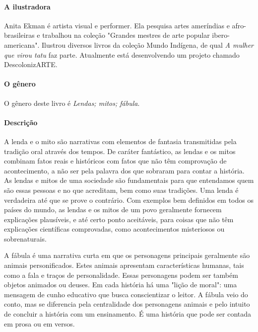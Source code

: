 \documentclass[11pt]{extarticle}
\begin{document}

\paragraph{A ilustradora} Anita Ekman é artista visual e performer. Ela pesquisa artes ameríndias e afro-brasileiras e trabalhou na coleção "Grandes mestres de arte popular ibero-americana". Ilustrou diversos livros da coleção Mundo Indígena, de qual \textit{A mulher que virou tatu} faz parte. Atualmente está desenvolvendo um projeto chamado DescolonizARTE.


\paragraph{O gênero} O gênero deste livro é \textit{Lendas; mitos; fábula}. 

\paragraph{Descrição} A lenda e o mito são narrativas com elementos de fantasia transmitidas pela tradição oral através dos tempos. De caráter fantástico, as lendas e os mitos combinam fatos reais e históricos com fatos que não têm comprovação de acontecimento, a não ser pela palavra dos que sobraram para contar a história. As lendas e mitos de uma sociedade são fundamentais para que entendamos quem são essas pessoas e no que acreditam, bem como suas tradições. Uma lenda é verdadeira até que se prove o contrário. Com exemplos bem definidos em todos os países do mundo, as lendas e os mitos de um povo geralmente fornecem explicações plausíveis, e até certo ponto aceitáveis, para coisas que não têm explicações científicas comprovadas, como acontecimentos misteriosos ou sobrenaturais.


A fábula é uma narrativa curta em que os personagens principais geralmente são animais personificados. Estes animais apresentam características humanas, tais como a fala e traços de personalidade. Essas personagens podem ser também objetos animados ou deuses. Em cada história há uma "lição de moral": uma mensagem de cunho educativo que busca conscientizar o leitor. A fábula veio do conto, mas se diferencia pela centralidade dos personagens animais e pelo intuito de concluir a história com um ensinamento. É uma história que pode ser contada em prosa ou em versos. 
\end{document}
